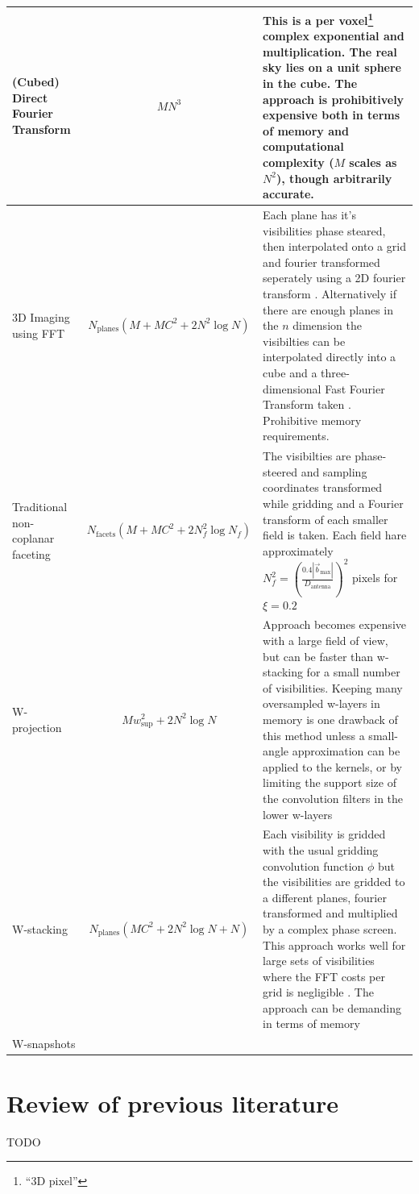 \begin{table}[ht]
  \begin{tabular}[c]{|p{3cm}|c|p{7cm}|}
  \hline
  (Cubed) Direct Fourier Transform & $MN^3$ & This is a per voxel\footnote{``3D pixel''} complex exponential and multiplication. The real sky lies on a unit sphere in the cube. The approach is prohibitively expensive both
  in terms of memory and computational complexity ($M$ scales as $N^2$), though arbitrarily accurate.\\
  \hline
  3D Imaging using FFT &$N_\text{planes}(M + MC^2 + 2N^2\log{N})$&Each plane has it's visibilities phase steared, then interpolated onto a grid and fourier transformed seperately using a 2D fourier transform \cite[Lecture 19]{taylor1999synthesis}. 
  Alternatively if there are enough planes in the $n$ dimension the visibilties can be interpolated directly into a cube and a three-dimensional Fast Fourier Transform taken \cite{yashar2009tdp}. Prohibitive memory requirements.\\
  \hline
  Traditional non-coplanar faceting & $N_\text{facets}(M + MC^2 + 2N_f^2\log{N_f})$&The visibilties are phase-steered and sampling coordinates transformed while gridding and a Fourier transform of each smaller field is taken. Each field hare approximately 
  $N_f^2=\left(\frac{0.4|\vec{b}_\text{max}|}{D_\text{antenna}}\right)^2$ pixels for $\xi=0.2$\\
  \hline
  W-projection & $Mw_\text{sup}^2+2N^2\log{N}$&Approach becomes expensive with a large field of view, but can be faster than w-stacking for a small number of visibilities. Keeping many oversampled w-layers in memory is one drawback
  of this method unless a small-angle approximation can be applied to the kernels, or by limiting the support size of the convolution filters in the lower w-layers\cite{offringa2014wsclean}\\
  \hline
  W-stacking & $N_\text{planes}(MC^2 + 2N^2\log{N} + N)$ &Each visibility is gridded with the usual gridding convolution function $\phi$ but the visibilities are gridded to a different planes, fourier transformed and 
  multiplied by a complex phase screen. This approach works well for large sets of visibilities where the FFT costs per grid is negligible \cite{offringa2014wsclean}. The approach can be demanding in terms of memory\\
  \hline
  W-snapshots & &\\
  \end{tabular}
  \caption[]{}
  \label{tbl_computational complexities}
\end{table}

\section{Review of previous literature}
TODO